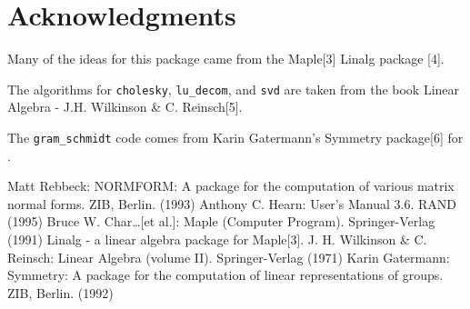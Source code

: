 \newpage

\section{Acknowledgments}

Many of the ideas for this package came from the Maple[3] Linalg package
[4].

The algorithms for {\tt cholesky}, {\tt lu\_decom}, and {\tt svd} are
taken from the book Linear Algebra - J.H. Wilkinson \& C. Reinsch[5].

The {\tt gram\_schmidt} code comes from Karin Gatermann's Symmetry
package[6] for {\REDUCE}.


\begin{thebibliography}{}
 Matt Rebbeck: NORMFORM: A {\REDUCE} package for the
computation of various matrix normal forms. ZIB, Berlin. (1993)
 Anthony C. Hearn: {\REDUCE} User's Manual 3.6.
        RAND (1995)
 Bruce W. Char\ldots [et al.]: Maple (Computer
        Program). Springer-Verlag (1991)
 Linalg - a linear algebra package for Maple[3].
 J. H. Wilkinson \& C. Reinsch: Linear Algebra
(volume II). Springer-Verlag (1971)
 Karin Gatermann: Symmetry: A {\REDUCE} package for the
computation of linear representations of groups. ZIB, Berlin. (1992)
\end{thebibliography}





